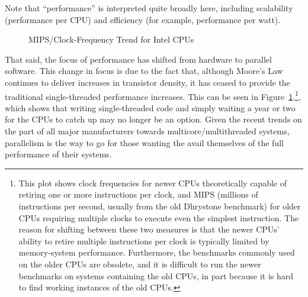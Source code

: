 Note that ``performance'' is interpreted quite broadly here,
including scalability (performance per CPU) and efficiency
(for example, performance per watt).

\begin{figure}[tb]
\begin{center}
\end{center}
\caption{MIPS/Clock-Frequency Trend for Intel CPUs}
\label{fig:intro:Clock-Frequency Trend for Intel CPUs}
\end{figure}

That said, the focus of performance has shifted from hardware to
parallel software.
This change in focus is due to the fact that, although Moore's Law
continues to deliver increases in transistor density, it has ceased to
provide the traditional single-threaded performance increases.
This can be seen in
Figure~\ref{fig:intro:Clock-Frequency Trend for Intel CPUs}.\footnote{	
	This plot shows clock frequencies for newer CPUs theoretically
	capable of retiring one or more instructions per clock, and MIPS
	(millions of instructions per second, usually from the old
	Dhrystone benchmark)
	for older CPUs requiring multiple clocks to execute even the
	simplest instruction.
	The reason for shifting between these two measures is that the
	newer CPUs' ability to retire multiple instructions per clock is
	typically limited by memory-system performance.
	Furthermore, the benchmarks commonly used on the older CPUs
	are obsolete, and it is difficult to run the newer benchmarks
	on systems containing the old CPUs, in part because it is hard
	to find working instances of the old CPUs.},
which shows that writing single-threaded code and simply waiting
a year or two for the CPUs to catch up may no longer be an option.
Given the recent trends on the part of all major manufacturers towards
multicore/multithreaded systems, parallelism is the way to go for
those wanting the avail themselves of the full performance of their
systems.

